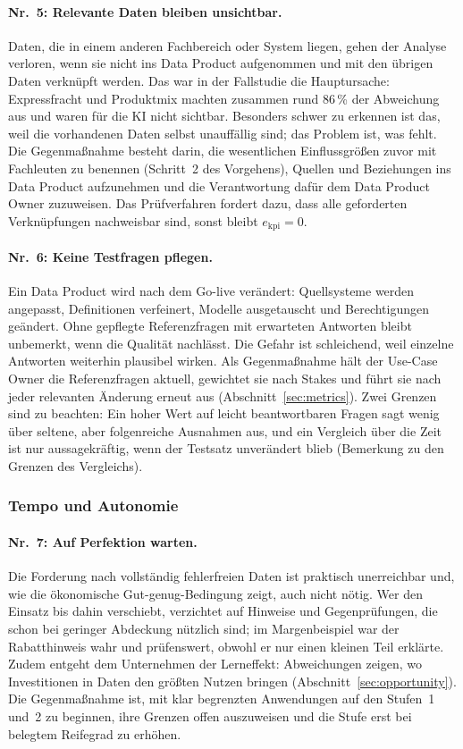 \documentclass[a4paper,12pt]{article}
\theoremstyle{definition}
\begin{document}
\paragraph{Nr.~5: Relevante Daten bleiben unsichtbar.}
Daten, die in einem anderen Fachbereich oder System liegen, gehen der Analyse verloren, wenn sie nicht ins Data Product aufgenommen und mit den übrigen Daten verknüpft werden. Das war in der Fallstudie die Hauptursache: Expressfracht und Produktmix machten zusammen rund 86\,\% der Abweichung aus und waren für die KI nicht sichtbar. Besonders schwer zu erkennen ist das, weil die vorhandenen Daten selbst unauffällig sind; das Problem ist, was fehlt. Die Gegenmaßnahme besteht darin, die wesentlichen Einflussgrößen zuvor mit Fachleuten zu benennen (Schritt~2 des Vorgehens), Quellen und Beziehungen ins Data Product aufzunehmen und die Verantwortung dafür dem Data Product Owner zuzuweisen. Das Prüfverfahren fordert dazu, dass alle geforderten Verknüpfungen nachweisbar sind, sonst bleibt $e_{\mathrm{kpi}}=0$.

\paragraph{Nr.~6: Keine Testfragen pflegen.}
Ein Data Product wird nach dem Go-live verändert: Quellsysteme werden angepasst, Definitionen verfeinert, Modelle ausgetauscht und Berechtigungen geändert. Ohne gepflegte Referenzfragen mit erwarteten Antworten bleibt unbemerkt, wenn die Qualität nachlässt. Die Gefahr ist schleichend, weil einzelne Antworten weiterhin plausibel wirken. Als Gegenmaßnahme hält der Use-Case Owner die Referenzfragen aktuell, gewichtet sie nach Stakes und führt sie nach jeder relevanten Änderung erneut aus (Abschnitt~\ref{sec:metrics}). Zwei Grenzen sind zu beachten: Ein hoher Wert auf leicht beantwortbaren Fragen sagt wenig über seltene, aber folgenreiche Ausnahmen aus, und ein Vergleich über die Zeit ist nur aussagekräftig, wenn der Testsatz unverändert blieb (Bemerkung zu den Grenzen des Vergleichs).

\subsubsection{Tempo und Autonomie}

\paragraph{Nr.~7: Auf Perfektion warten.}
Die Forderung nach vollständig fehlerfreien Daten ist praktisch unerreichbar und, wie die ökonomische Gut-genug-Bedingung zeigt, auch nicht nötig. Wer den Einsatz bis dahin verschiebt, verzichtet auf Hinweise und Gegenprüfungen, die schon bei geringer Abdeckung nützlich sind; im Margenbeispiel war der Rabatthinweis wahr und prüfenswert, obwohl er nur einen kleinen Teil erklärte. Zudem entgeht dem Unternehmen der Lerneffekt: Abweichungen zeigen, wo Investitionen in Daten den größten Nutzen bringen (Abschnitt~\ref{sec:opportunity}). Die Gegenmaßnahme ist, mit klar begrenzten Anwendungen auf den Stufen~1 und~2 zu beginnen, ihre Grenzen offen auszuweisen und die Stufe erst bei belegtem Reifegrad zu erhöhen.
\end{document}
